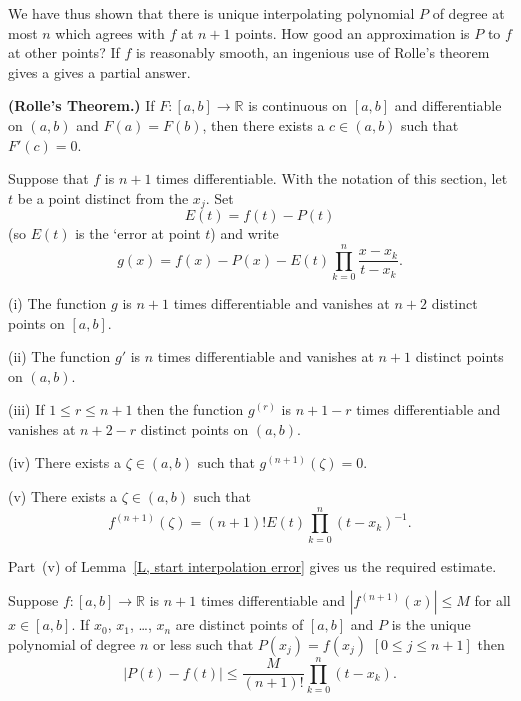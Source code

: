 We have thus shown that there is unique interpolating polynomial $P$
of degree at most $n$ which agrees with $f$ at $n+1$ points.
How good an approximation is $P$ to $f$ at other points?
If $f$ is reasonably smooth, an ingenious use of Rolle's
theorem gives a gives a partial answer.
\begin{theorem}{\bf (Rolle's Theorem.)} If
$F:[a,b]\rightarrow{\mathbb R}$ is continuous on $[a,b]$
and differentiable on $(a,b)$
and $F(a)=F(b)$, then there exists a $c\in(a,b)$
such that $F'(c)=0$.
\end{theorem}
\begin{lemma}\label{L, start interpolation error}
Suppose that $f$ is $n+1$ times differentiable.
With the notation of this section, let
$t$ be a point distinct from the $x_{j}$. Set
\[E(t)=f(t)-P(t)\]
(so $E(t)$ is the `error at point $t$) and write
\[g(x)=f(x)-P(x)-E(t)
\prod_{k=0}^{n}\frac{x-x_{k}}{t-x_{k}}.\]

(i) The function $g$ is $n+1$ times differentiable and
vanishes at $n+2$ distinct points on $[a,b]$.

(ii) The function $g'$ is $n$ times differentiable and
vanishes at $n+1$ distinct points on $(a,b)$.

(iii) If $1\leq r\leq n+1$ then
the function $g^{(r)}$ is $n+1-r$ times differentiable and
vanishes at $n+2-r$ distinct points on $(a,b)$.

(iv) There exists a $\zeta\in(a,b)$ such that
$g^{(n+1)}(\zeta)=0$.

(v) There exists a $\zeta\in(a,b)$ such that
\[f^{(n+1)}(\zeta)=(n+1)!E(t)\prod_{k=0}^{n}(t-x_{k})^{-1}.\]
\end{lemma}
Part~(v) of Lemma~\ref{L, start interpolation error}
gives us the required estimate.
\begin{theorem}\label{T, interpolation error}
Suppose $f:[a,b]\rightarrow{\mathbb R}$
is $n+1$ times differentiable and $|f^{(n+1)}(x)|\leq M$
for all $x\in[a,b]$. If $x_{0}$, $x_{1}$, \dots, $x_{n}$
are distinct points of $[a,b]$ and $P$ is the unique polynomial
of degree $n$ or less such that $P(x_{j})=f(x_{j})$
$[0\leq j\leq n+1]$ then
\[|P(t)-f(t)|\leq \frac{M}{(n+1)!}\prod_{k=0}^{n}(t-x_{k}).\]
\end{theorem}

